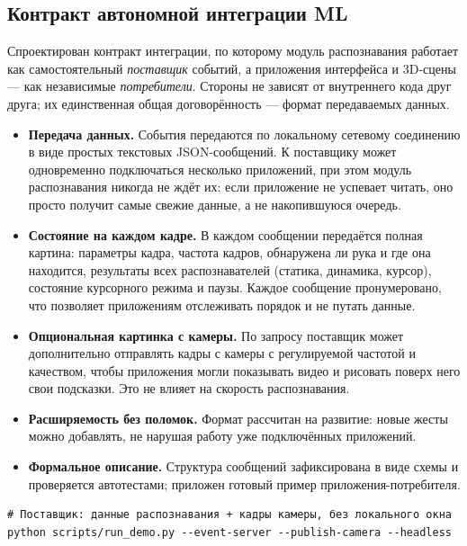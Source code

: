 \documentclass[11pt,a4paper]{article}
\begin{document}
\subsection{Контракт автономной интеграции ML}

Спроектирован контракт интеграции, по которому модуль распознавания работает как самостоятельный
\emph{поставщик} событий, а приложения интерфейса и 3D-сцены — как независимые \emph{потребители}.
Стороны не зависят от внутреннего кода друг друга; их единственная общая договорённость — формат
передаваемых данных.

\begin{itemize}[leftmargin=1.4em]
  \item \textbf{Передача данных.} События передаются по локальному сетевому соединению в виде
        простых текстовых JSON-сообщений. К поставщику может одновременно подключаться несколько
        приложений, при этом модуль распознавания никогда не ждёт их: если приложение не успевает
        читать, оно просто получит самые свежие данные, а не накопившуюся очередь.
  \item \textbf{Состояние на каждом кадре.} В каждом сообщении передаётся полная картина: параметры
        кадра, частота кадров, обнаружена ли рука и где она находится, результаты всех
        распознавателей (статика, динамика, курсор), состояние курсорного режима и паузы. Каждое
        сообщение пронумеровано, что позволяет приложениям отслеживать порядок и не путать данные.
  \item \textbf{Опциональная картинка с камеры.} По запросу поставщик может дополнительно
        отправлять кадры с камеры с регулируемой частотой и качеством, чтобы приложения могли
        показывать видео и рисовать поверх него свои подсказки. Это не влияет на скорость
        распознавания.
  \item \textbf{Расширяемость без поломок.} Формат рассчитан на развитие: новые жесты можно
        добавлять, не нарушая работу уже подключённых приложений.
  \item \textbf{Формальное описание.} Структура сообщений зафиксирована в виде схемы и проверяется
        автотестами; приложен готовый пример приложения-потребителя.
\end{itemize}

\begin{lstlisting}[caption={Запуск автономного поставщика событий},captionpos=b]
# Поставщик: данные распознавания + кадры камеры, без локального окна
python scripts/run_demo.py --event-server --publish-camera --headless
\end{lstlisting}
\end{document}
